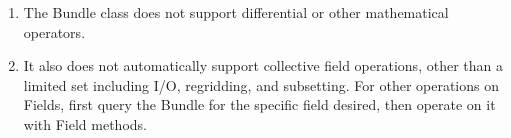 

\begin{enumerate}

\item The Bundle class does not support differential or other
mathematical operators.

\item It also does not automatically support collective field operations,
other than a limited set including I/O, regridding, and subsetting.
For other operations on Fields, first query the Bundle for the
specific field desired, then operate on it with Field methods.

\end{enumerate}
